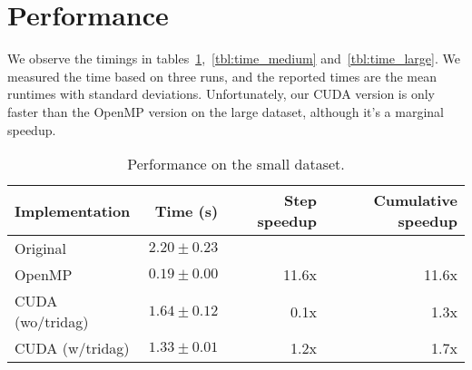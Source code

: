 \documentclass[a4paper]{article}
\begin{document}
\section{Performance}




We observe the timings in tables~\ref{tbl:time_small},~\ref{tbl:time_medium}
and~\ref{tbl:time_large}. We measured the time based on three runs, and the
reported times are the mean runtimes with standard deviations. Unfortunately,
our CUDA version is only faster than the OpenMP version on the large dataset,
although it's a marginal speedup.

\begin{table}
    \centering
    \begin{tabular}{lrrr}
        \toprule
        \textbf{Implementation} & \textbf{Time (s)} & \textbf{Step speedup} & \textbf{Cumulative speedup} \\
        \midrule
        Original         & $2.20\pm0.23$ &       &       \\
        OpenMP           & $0.19\pm0.00$ & 11.6x & 11.6x \\
        CUDA (wo/tridag) & $1.64\pm0.12$ &  0.1x &  1.3x \\
        CUDA (w/tridag)  & $1.33\pm0.01$ &  1.2x &  1.7x \\
        \bottomrule
    \end{tabular}
    \caption{Performance on the small dataset.}
    \label{tbl:time_small}
\end{table}
\end{document}
